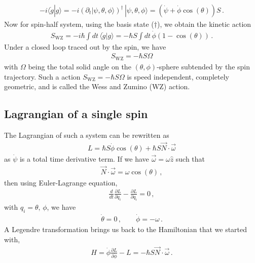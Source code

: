 \documentclass[11pt, onesided]{book}
\theoremstyle{break}
\theoremstyle{break}
\newcommand{\pd}{\partial}
\begin{document}
\begin{align*}
-i\langle \dot{g}|g\rangle = -i\left(\pd_t |\psi,\theta,\phi\rangle\right)^\dagger\, |\psi,\theta,\phi\rangle = (\dot{\psi}+\dot{\phi}\cos(\theta))S\,.
\end{align*}
Now for spin-half system, using the basis state ($\dagger$), we obtain the kinetic action
\begin{align*}
S_{\text{WZ}} = -i\hbar \int dt\, \langle \dot{g}|g\rangle = -\hbar S\int dt\, \dot{\phi}(1-\cos(\theta))\,.
\end{align*}
Under a closed loop traced out by the spin, we have
\begin{align*}
S_{\text{WZ}} = -\hbar S\Omega
\end{align*}
with $\Omega$ being the total solid angle on the $(\theta, \phi)$-sphere subtended by the spin trajectory. Such a action $S_{\text{WZ}} = -\hbar S\Omega$ is speed independent, completely geometric, and is called the Wess and Zumino (WZ) action.\\

\subsection{Lagrangian of a single spin}
The Lagrangian of such a system can be rewritten as
\begin{align*}
L = \hbar S \dot{\phi}\cos(\theta)  + \hbar S\vec{N}\cdot \vec{\omega} \tag{$\ddagger$}
\end{align*}
as $\dot{\psi}$ is a total time derivative term. If we have $\vec{\omega} = \omega \hat{z}$ such that 
\begin{align*}
\vec{N}\cdot \vec{\omega} = \omega \cos(\theta)\,,
\end{align*}
then using Euler-Lagrange equation, 
\begin{align*}
\frac{d}{dt}\frac{\pd L}{\pd \dot{q}_i} - \frac{\pd L}{\pd q_i} = 0\,,
\end{align*}
with $q_i = \theta, \,\phi$, we have
\begin{align*}
\dot{\theta} = 0\,,\qquad
\dot{\phi} = -\omega\,.
\end{align*}
A Legendre transformation brings us back to the Hamiltonian that we started with,
\begin{align*}
H = \dot{\phi}\frac{\pd L}{\pd \dot{\phi}} - L = -\hbar S \vec{N}\cdot \vec{\omega}\,. 
\end{align*}
\end{document}
